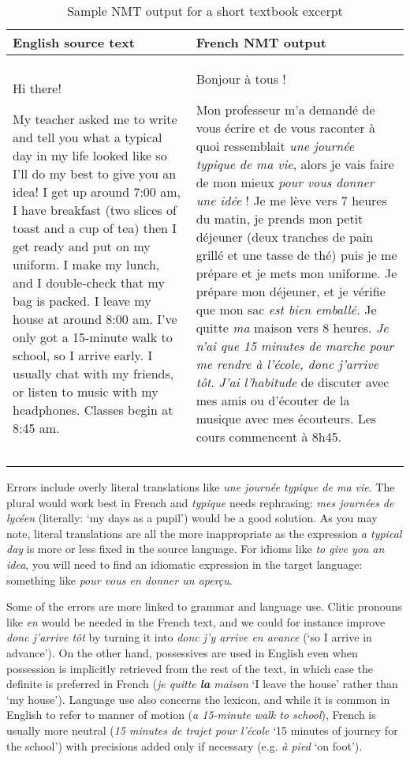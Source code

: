 \documentclass[output=paper,colorlinks,citecolor=brown,
]{langscibook}
\begin{document}
\begin{table}
\begin{tabularx}{\textwidth}{L{5.1cm}L{6.5cm}}

\lsptoprule
{English source text} & {French NMT output}\\
\midrule
Hi there!

My teacher asked me to write and tell you what a typical day in my life looked like so I’ll do my best to give you an idea! I get up around 7:00 am, I have breakfast (two slices of toast and a cup of tea) then I get ready and put on my uniform. I make my lunch, and I double-check that my bag is packed. I leave my house at around 8:00 am. I’ve only got a 15-minute walk to school, so I arrive early. I usually chat with my friends, or listen to music with my headphones. Classes begin at 8:45 am. & Bonjour à tous !

Mon professeur m'a demandé de vous écrire et de vous raconter à quoi ressemblait \textit{une journée typique de ma vie}, alors je vais faire de mon mieux \textit{pour vous donner une idée} ! Je me lève vers 7 heures du matin, je prends mon petit déjeuner (deux tranches de pain grillé et une tasse de thé) puis je me prépare et je mets mon uniforme. Je prépare mon déjeuner, et je vérifie que mon sac \textit{est bien emballé.} Je quitte \textit{ma} maison vers 8 heures. \textit{Je n'ai que 15 minutes de marche pour me rendre à l'école, donc j'arrive tôt}. \textit{J'ai l'habitude} de discuter avec mes amis ou d'écouter de la musique avec mes écouteurs. Les cours commencent à 8h45.\\
\lspbottomrule
\end{tabularx}
\caption{Sample NMT output for a short textbook excerpt} 
\label{tab:carre:4}
\end{table}

Errors include overly literal translations like \textit{une journée typique de ma vie}. The plural would work best in French and \textit{typique} needs rephrasing: \textit{mes journées de lycéen} (literally: ‘my days as a pupil’) would be a good solution. As you may note, literal translations are all the more inappropriate as the expression \textit{a typical day} is more or less fixed in the source language. For idioms like \textit{to give you an idea}, you will need to find an idiomatic expression in the target language: something like \textit{pour vous en donner un aperçu}.

Some of the errors are more linked to grammar and language use. Clitic pronouns like \textit{en} would be needed in the French text, and we could for instance improve \textit{donc j’arrive tôt} by turning it into \textit{donc j’y arrive en avance} (‘so I arrive in advance’). On the other hand, possessives are used in English even when possession is implicitly retrieved from the rest of the text, in which case the definite is preferred in French (\textit{je quitte \textbf{la} maison} ‘I leave the house’ rather than ‘my house’). Language use also concerns the lexicon, and while it is common in English to refer to manner of motion (\textit{a 15-minute walk to school}), French is usually more neutral (\textit{15 minutes de trajet pour l’école} ‘15 minutes of journey for the school’) with precisions added only if necessary (e.g. \textit{à pied} ‘on foot’).
\end{document}

